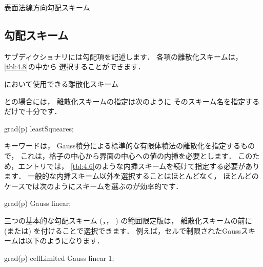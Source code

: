 \begin{table}[ht]
 
 \caption{表面法線方向勾配スキーム}
 \label{tbl:4.7}
\end{table}


\subsection{勾配スキーム}
\label{ssec:4.4.3}
サブディクショナリには勾配項を記述します．
各項の離散化スキームは，\autoref{tbl:4.8}の中から
選択することができます．


\begin{table}[ht]
 
 \caption{において使用できる離散化スキーム}
 \label{tbl:4.8}
\end{table}


との場合には，
離散化スキームの指定は次のように
そのスキーム名を指定するだけで十分です．
\begin{OFverbatim}[file]
grad(p) leastSqueares;
\end{OFverbatim}
キーワードは，
Gauss積分による標準的な有限体積法の離散化を指定するもので，
これは，格子の中心から界面の中心への値の内挿を必要とします．
このため，エントリでは，
\autoref{tbl:4.6}のような内挿スキームを続けて指定する必要があります．
一般的な内挿スキーム以外を選択することはほとんどなく，
ほとんどのケースでは次のようにスキームを選ぶのが効率的です．
\begin{OFverbatim}[file]
grad(p) Gauss linear;
\end{OFverbatim}
三つの基本的な勾配スキーム (，，
) の範囲限定版は，
離散化スキームの前に
 (または) を付けることで選択できます．
例えば，セルで制限されたGaussスキームは以下のようになります．
\begin{OFverbatim}[file]
grad(p) cellLimited Gauss linear 1;
\end{OFverbatim}


